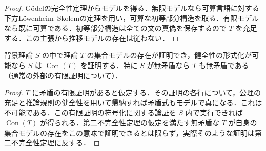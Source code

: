 \begin{proof}
Gödelの完全性定理からモデルを得る．無限モデルなら可算言語に対する下方Löwenheim–Skolemの定理を用い，可算な初等部分構造を取る．有限モデルなら既に可算である．初等部分構造は全ての文の真偽を保存するので $T$ を充足する．この主張から推移モデルの存在は従わない．
\end{proof}
\begin{prop}[モデルによる相対的無矛盾性]
背景理論 $S$ の中で理論 $T$ の集合モデルの存在が証明でき，健全性の形式化が可能なら $S$ は $\operatorname{Con}(T)$ を証明する．特に $S$ が無矛盾なら $T$ も無矛盾である（通常の外部の有限証明について）．
\end{prop}
\begin{proof}
$T$ に矛盾の有限証明があると仮定する．その証明の各行について，公理の充足と推論規則の健全性を用いて帰納すれば矛盾式もモデルで真になる．これは不可能である．この有限証明の符号化に関する論証を $S$ 内で実行できれば $\operatorname{Con}(T)$ が得られる．第二不完全性定理の仮定を満たす無矛盾な $T$ が自身の集合モデルの存在をこの意味で証明できるとは限らず，実際そのような証明は第二不完全性定理に反する．
\end{proof}

